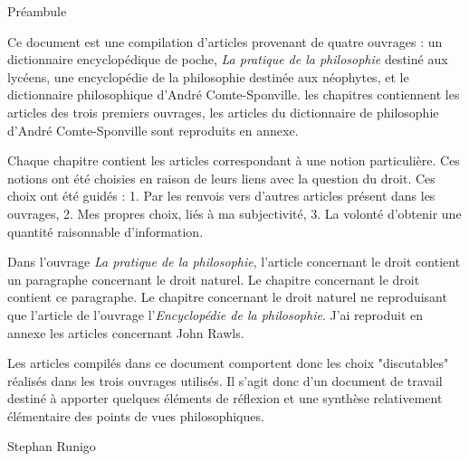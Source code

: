 
\thispagestyle{empty}

\begin{center}
\Large
Préambule
\normalsize
\end{center}
\vspace{3cm}

Ce document est une compilation d'articles provenant de quatre ouvrages : un dictionnaire encyclopédique de poche, {\it La pratique de la philosophie} destiné aux lycéens, une encyclopédie de la philosophie destinée aux néophytes, et le dictionnaire philosophique d'André Comte-Sponville.
les chapitres contiennent les articles des trois premiers ouvrages, les articles du dictionnaire de philosophie d'André Comte-Sponville sont reproduits en annexe.

\vspace{1.3cm}


Chaque chapitre contient les articles correspondant à une notion particulière. Ces notions ont été choisies en raison de leurs liens avec la question du droit. Ces choix ont été guidés : 1. Par les renvois vers d'autres articles présent dans les ouvrages, 2. Mes propres choix, liés à ma subjectivité, 3. La volonté d'obtenir une quantité raisonnable d'information.

\vspace{1.3cm}

Dans l'ouvrage {\it La pratique de la philosophie}, l'article concernant le droit contient un paragraphe concernant le droit naturel. Le chapitre concernant le droit contient ce paragraphe. Le chapitre concernant le droit naturel ne reproduisant que l'article de l'ouvrage l'{\it Encyclopédie de la philosophie}.
J'ai reproduit en annexe les articles concernant John Rawls.

Les articles compilés dans ce document comportent donc les choix "discutables" réalisés dans les trois ouvrages utilisés. Il s'agit donc d'un document de travail destiné à apporter quelques éléments de réflexion et une synthèse relativement élémentaire des points de vues philosophiques.

\vspace{1.3cm}

\hfill Stephan Runigo

